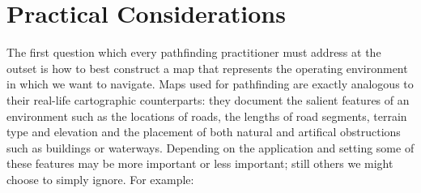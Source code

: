 \section{Practical Considerations}
\label{cha::intro::practical}

The first question which every pathfinding practitioner must address at the 
outset is how to best construct a map that represents the operating
environment in which we want to navigate.
Maps used for pathfinding are exactly analogous to their real-life cartographic 
counterparts: they document the salient features of an environment such as the
locations of roads, the lengths of road segments, terrain type and elevation
and the placement of both natural and artifical obstructions such as buildings 
or waterways. 
Depending on the application and setting some of these 
features may be more important or less important; still others we might choose
 to simply ignore. For example:


